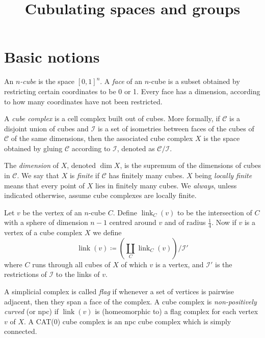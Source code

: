 \documentclass{report}
\DeclareMathOperator{\link}{link}
\theoremstyle{definition}
\theoremstyle{plain}
\theoremstyle{definition}
\begin{document}
	\title{Cubulating spaces and groups}
	\maketitle
	\section{Basic notions}
	An $n$\emph{-cube} is the space $[0,1]^n$. A \emph{face} of an $n$-cube is a subset obtained by restricting certain coordinates to be 0 or 1. Every face has a dimension, according to how many coordinates have not been restricted.
	
	A \emph{cube complex} is a cell complex built out of cubes. More formally, if $\mathcal{C}$ is a disjoint union of cubes and $\mathcal{I}$ is a set of isometries between faces of the cubes of $\mathcal{C}$ of the same dimensions, then the associated cube complex $X$ is the space obtained by gluing $\mathcal{C}$ according to $\mathcal{I}$, denoted as $\mathcal{C}/\mathcal{I}$.
	
	The \emph{dimension} of $X$, denoted $\dim X$, is the supremum of the dimensions of cubes in $\mathcal{C}$. We say that $X$ is \emph{finite} if $\mathcal{C}$ has finitely many cubes. $X$ being \emph{locally finite} means that every point of $X$ lies in finitely many cubes. We \emph{always}, unless indicated otherwise, assume cube complexes are locally finite. 
	
	Let $v$ be the vertex of an $n$-cube $C$. Define $\link_C(v)$ to be the intersection of $C$ with a sphere of dimension $n-1$ centred around $v$ and of radius $\frac{1}{4}$. Now if $v$ is a vertex of a cube complex $X$ we define 
	\[
		\link(v) \coloneqq \left(\coprod_{C} \link_C(v)\right)/\mathcal{I}'		
	\]
	where $C$ runs through all cubes of $X$ of which $v$ is a vertex, and $\mathcal{I}'$ is the restrictions of $\mathcal{I}$ to the links of $v$.
	
	A simplicial complex is called \emph{flag} if whenever a set of vertices is pairwise adjacent, then they span a face of the complex. A cube complex is \emph{non-positively curved} (or npc) if $\link(v)$ is (homeomorphic to) a flag complex for each vertex $v$ of $X$. A CAT(0) cube complex is an npc cube complex which is simply connected.
	
		
\end{document}
